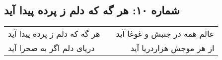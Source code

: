 \begin{center}
\section*{شماره ۱۰: هر گه که دلم ز پرده پیدا آید}
\label{sec:010}
\begin{longtable}{l p{0.5cm} r}
هر گه که دلم ز پرده پیدا آید
&&
عالم همه در جنبش و غوغا آید
\\
دریای دلم اگر به صحرا آید
&&
از هر موجش هزاردریا آید
\\
\end{longtable}
\end{center}
